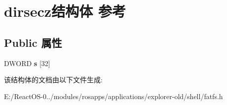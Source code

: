\hypertarget{structdirsecz}{}\section{dirsecz结构体 参考}
\label{structdirsecz}
\subsection*{Public 属性}
\begin{DoxyCompactItemize}
\item 
\mbox{\label{structdirsecz_a0fd2a7c2f6b80efbb7b7d35dc4a4ea32}} 
D\+W\+O\+RD {\bfseries s} \mbox{[}32\mbox{]}
\end{DoxyCompactItemize}


该结构体的文档由以下文件生成\+:\begin{DoxyCompactItemize}
\item 
E\+:/\+React\+O\+S-\/0../modules/rosapps/applications/explorer-\/old/shell/fatfs.\+h\end{DoxyCompactItemize}
